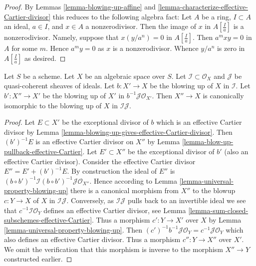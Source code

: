 \begin{proof}
By Lemmas \ref{lemma-blowing-up-affine} and
\ref{lemma-characterize-effective-Cartier-divisor}
this reduces to the following algebra fact:
Let $A$ be a ring, $I \subset A$ an ideal, $a \in I$, and $x \in A$
a nonzerodivisor. Then the image of $x$ in $A[\frac{I}{a}]$ is a
nonzerodivisor. Namely, suppose that $x (y/a^n) = 0$ in $A[\frac{I}{a}]$.
Then $a^mxy = 0$ in $A$ for some $m$. Hence $a^my = 0$ as $x$ is a
nonzerodivisor. Whence $y/a^n$ is zero in $A[\frac{I}{a}]$ as desired.
\end{proof}

\begin{lemma}
\label{lemma-blowing-up-two-ideals}
Let $S$ be a scheme. Let $X$ be an algebraic space over $S$.
Let $\mathcal{I} \subset \mathcal{O}_X$ and $\mathcal{J}$ be
quasi-coherent sheaves of ideals. Let $b : X' \to X$ be the blowing up
of $X$ in $\mathcal{I}$. Let $b' : X'' \to X'$ be the blowing up of
$X'$ in $b^{-1}\mathcal{J} \mathcal{O}_{X'}$. Then $X'' \to X$
is canonically isomorphic to the blowing up of $X$ in $\mathcal{I}\mathcal{J}$.
\end{lemma}

\begin{proof}
Let $E \subset X'$ be the exceptional divisor of $b$ which is an effective
Cartier divisor by
Lemma \ref{lemma-blowing-up-gives-effective-Cartier-divisor}.
Then $(b')^{-1}E$ is an effective Cartier divisor on $X''$ by
Lemma \ref{lemma-blow-up-pullback-effective-Cartier}.
Let $E' \subset X''$ be the exceptional divisor of $b'$ (also an effective
Cartier divisor). Consider the effective Cartier divisor
$E'' = E' + (b')^{-1}E$. By construction the ideal of $E''$ is
$(b \circ b')^{-1}\mathcal{I} (b \circ b')^{-1}\mathcal{J} \mathcal{O}_{X''}$.
Hence according to Lemma \ref{lemma-universal-property-blowing-up}
there is a canonical morphism from $X''$ to the blowup $c : Y \to X$
of $X$ in $\mathcal{I}\mathcal{J}$. Conversely, as $\mathcal{I}\mathcal{J}$
pulls back to an invertible ideal we see that
$c^{-1}\mathcal{I}\mathcal{O}_Y$ defines
an effective Cartier divisor, see
Lemma \ref{lemma-sum-closed-subschemes-effective-Cartier}.
Thus a morphism $c' : Y \to X'$ over $X$ by
Lemma \ref{lemma-universal-property-blowing-up}.
Then $(c')^{-1}b^{-1}\mathcal{J}\mathcal{O}_Y = c^{-1}\mathcal{J}\mathcal{O}_Y$
which also defines an effective Cartier divisor. Thus a morphism
$c'' : Y \to X''$ over $X'$. We omit the verification that this
morphism is inverse to the morphism $X'' \to Y$ constructed earlier.
\end{proof}

